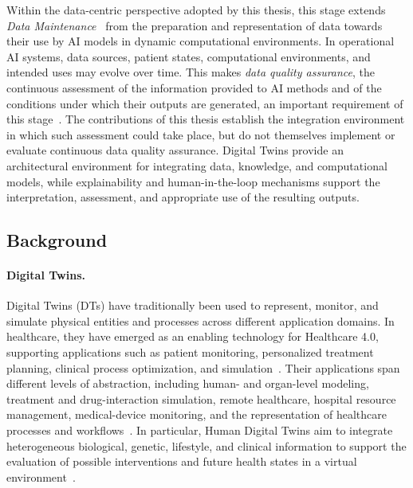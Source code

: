 Within the data-centric perspective adopted by this thesis, this stage extends \emph{Data Maintenance}~\cite{zha_data-centric_2025} from the preparation and representation of data towards their use by AI models in dynamic computational environments. In operational AI systems, data sources, patient states, computational environments, and intended uses may evolve over time. This makes \emph{data quality assurance}, the continuous assessment of the information provided to AI methods and of the conditions under which their outputs are generated, an important requirement of this stage~\cite{zha_data-centric_2025}. The contributions of this thesis establish the integration environment in which such assessment could take place, but do not themselves implement or evaluate continuous data quality assurance. Digital Twins provide an architectural environment for integrating data, knowledge, and computational models, while explainability and human-in-the-loop mechanisms support the interpretation, assessment, and appropriate use of the resulting outputs.

\subsection{Background}
\label{subsec:inference_background}

\paragraph{Digital Twins.}

Digital Twins (DTs) have traditionally been used to represent, monitor, and simulate physical entities and processes across different application domains. In healthcare, they have emerged as an enabling technology for Healthcare 4.0, supporting applications such as patient monitoring, personalized treatment planning, clinical process optimization, and simulation~\cite{9255249_erol,9900390_alazab,Björnsson2019,Katsoulakis2024}. Their applications span different levels of abstraction, including human- and organ-level modeling, treatment and drug-interaction simulation, remote healthcare, hospital resource management, medical-device monitoring, and the representation of healthcare processes and workflows~\cite{SHENGLI2021100014,Björnsson2019,9325551_ricci,8846667_yang_peng,9320532_elayan_haya}. In particular, Human Digital Twins aim to integrate heterogeneous biological, genetic, lifestyle, and clinical information to support the evaluation of possible interventions and future health states in a virtual environment~\cite{SHENGLI2021100014,Björnsson2019}.

